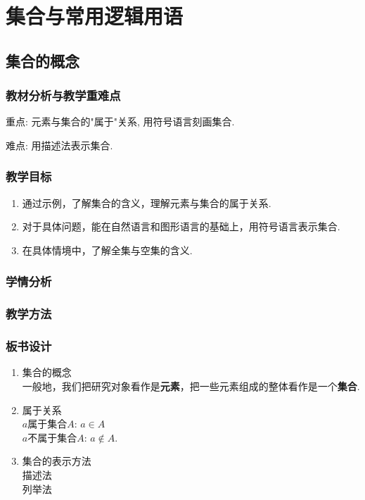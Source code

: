 \chapter{集合与常用逻辑用语}
\section{集合的概念}
\subsection{教材分析与教学重难点}
重点: 元素与集合的"属于"关系, 用符号语言刻画集合.

难点: 用描述法表示集合.
\subsection{教学目标}
\begin{enumerate}
	\item 通过示例，了解集合的含义，理解元素与集合的属于关系.
	\item 对于具体问题，能在自然语言和图形语言的基础上，用符号语言表示集合.
	\item 在具体情境中，了解全集与空集的含义.
\end{enumerate}
\subsection{学情分析}

\subsection{教学方法}

\subsection{板书设计}
\begin{boardenv}[集合的概念]
	\begin{enumerate}
		\item 集合的概念\\
		      一般地，我们把研究对象看作是\textbf{元素}，把一些元素组成的整体看作是一个\textbf{集合}.
		\item 属于关系\\
		      $a$属于集合$A$: $a\in A$\\
		      $a$不属于集合$A$: $a\notin A$.
		\item 集合的表示方法\\
		      描述法\\
		      列举法
	\end{enumerate}
\end{boardenv}



